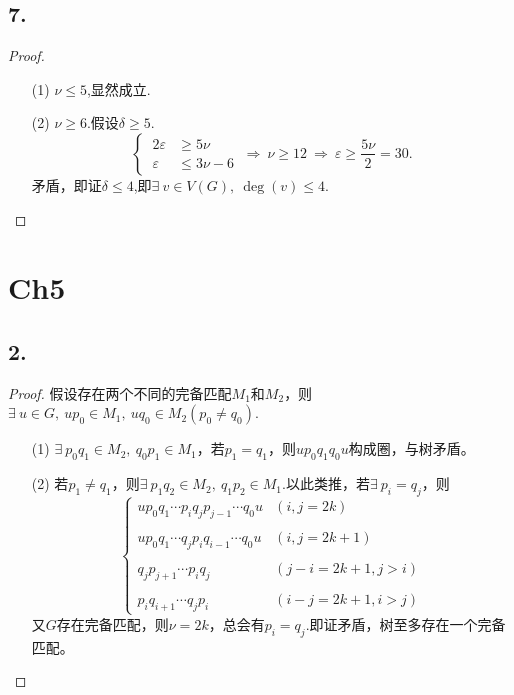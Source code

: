 \documentclass{article}
\begin{document}
\subsection*{7.}
\begin{proof}
    \begin{enumerate}
        \item []
        \item [(1)]$\nu \leq 5$,显然成立.
        \item [(2)]$\nu \geq 6$.假设$\delta \geq 5$.
        \[
            \begin{cases}
                \ 2\varepsilon &\geq 5\nu\\
                \ \varepsilon & \leq 3\nu -6
            \end{cases}
            \ \Rightarrow\ 
            \nu \geq 12
            \ \Rightarrow\ 
            \varepsilon \geq \displaystyle{\frac{5\nu}{2}}=30.
        \]
        矛盾，即证$\delta \leq 4$,即$\exists\ v\in V(G),\ \deg(v)\leq 4$.
    \end{enumerate}
\end{proof}

\section*{Ch5}
\subsection*{2.}
\begin{proof}
    假设存在两个不同的完备匹配$M_1$和$M_2$，则$\exists\ u\in G,\ u p_0 \in M_1,\ u q_0 \in M_2(p_0 \neq q_0)$.
    \begin{enumerate}
        \item [(1)]$\exists\ p_0 q_1 \in M_2,\ q_0 p_1 \in M_1$，若$p_1 = q_1$，则$u p_0 q_1 q_0 u$构成圈，与树矛盾。
        \item [(2)]若$p_1\neq q_1$，则$\exists\ p_1 q_2\in M_2,\ q_1 p_2\in M_1$.以此类推，若$\exists\ p_i=q_j$，则
        \[
            \begin{cases}
                u p_0 q_1 \cdots p_i q_j p_{j-1}\cdots q_0 u &(i,j=2k)\\
                \\
                u p_0 q_1 \cdots q_j p_i q_{i-1}\cdots q_0 u &(i,j=2k+1)\\
                \\
                q_j p_{j+1}\cdots p_{i} q_{j} &(j-i=2k+1,j>i)\\
                \\
                p_i q_{i+1}\cdots q_{j} p_{i} &(i-j=2k+1,i>j)
            \end{cases}
        \]
        又$G$存在完备匹配，则$\nu=2k$，总会有$p_i=q_j$.即证矛盾，树至多存在一个完备匹配。
    \end{enumerate}
\end{proof}
\end{document}
